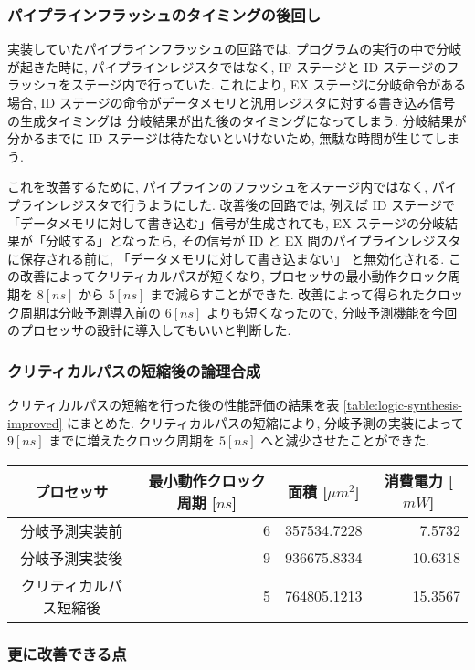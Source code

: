 \documentclass[../improvements.tex]{subfiles}
\begin{document}
  \subsubsection{パイプラインフラッシュのタイミングの後回し} \label{subsubsection:rethink-flush}
  実装していたパイプラインフラッシュの回路では, 
  プログラムの実行の中で分岐が起きた時に, 
  パイプラインレジスタではなく, IF ステージと ID ステージのフラッシュをステージ内で行っていた.
  これにより, EX ステージに分岐命令がある場合, 
  ID ステージの命令がデータメモリと汎用レジスタに対する書き込み信号の生成タイミングは
  分岐結果が出た後のタイミングになってしまう.
  分岐結果が分かるまでに ID ステージは待たないといけないため, 無駄な時間が生じてしまう.

  これを改善するために, パイプラインのフラッシュをステージ内ではなく, パイプラインレジスタで行うようにした.
  改善後の回路では, 例えば ID ステージで「データメモリに対して書き込む」信号が生成されても, 
  EX ステージの分岐結果が「分岐する」となったら, 
  その信号が ID と EX 間のパイプラインレジスタに保存される前に, 「データメモリに対して書き込まない」
  と無効化される.
  この改善によってクリティカルパスが短くなり, 
  プロセッサの最小動作クロック周期を $8[ns]$ から $5[ns]$ まで減らすことができた.
  改善によって得られたクロック周期は分岐予測導入前の $6[ns]$ よりも短くなったので, 
  分岐予測機能を今回のプロセッサの設計に導入してもいいと判断した.

  \subsubsection{クリティカルパスの短縮後の論理合成}
  クリティカルパスの短縮を行った後の性能評価の結果を表 \ref{table:logic-synthesis-improved} にまとめた.
  クリティカルパスの短縮により, 分岐予測の実装によって $9[ns]$ までに増えたクロック周期を
  $5[ns]$ へと減少させたことができた.

  \begin{table*}[bp]
    \centering
    \begin{tabular}{|c|r|r|r|}
    \hline
    プロセッサ & \multicolumn{1}{c|}{最小動作クロック周期 {[}$ns${]}} & \multicolumn{1}{c|}{面積 {[}$\mu m^2${]}} & \multicolumn{1}{c|}{消費電力 {[}$mW${]}} \\ \hline
    分岐予測実装前 & 6 & 357534.7228 & 7.5732 \\
    分岐予測実装後 & 9 & 936675.8334 & 10.6318 \\
    クリティカルパス短縮後 & 5 & 764805.1213 & 15.3567 \\ \hline
    \end{tabular}
    \caption{性能改善前後の論理合成の結果}
    \label{table:logic-synthesis-improved}
  \end{table*}

  \subsubsection{更に改善できる点}
\end{document}
